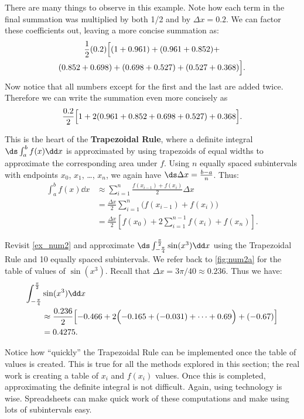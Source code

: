 There are many things to observe in this example. Note how each term in the final summation was multiplied by both 1/2 and by $\Delta x = 0.2$. We can factor these coefficients out, leaving a more concise summation as:
\begin{multline*}
\frac12(0.2)\Bigl[(1+0.961) + (0.961+0.852) +\\
 (0.852+0.698) + ( 0.698+ 0.527) +(0.527 + 0.368)\Bigr].
\end{multline*}
Now notice that all numbers except for the first and the last are added twice. Therefore we can write the summation even more concisely as
\[\frac{0.2}{2}\Bigl[1 + 2(0.961+0.852+0.698+0.527) + 0.368\Bigr].\]

This is the heart of the \textbf{Trapezoidal Rule}, where a definite integral $\ds \int_a^b f(x)\dd x$ is approximated by using trapezoids of equal widths to approximate the corresponding area under $f$. Using $n$ equally spaced subintervals with endpoints $x_0$, $x_1$, \dots, $x_n$, we again have $\ds \Delta x = \frac{b-a}n$. Thus:
\begin{align*}
	\int_a^b f(x)\dd x
	& \approx \sum_{i=1}^n \frac{f(x_{i-1})+f(x_i)}2\Delta x \\
	& = \frac{\Delta x}2 \sum_{i=1}^n \bigl(f(x_{i-1})+f(x_i)\bigr)\\
	& = \frac{\Delta x}2\left[f(x_0)+ 2\sum_{i=1}^{n-1} f(x_i) + f(x_n)\right].
\end{align*}

\begin{example}\label{ex_num4}%
Revisit \autoref{ex_num2} and approximate $\ds\int_{-\frac{\pi}{4}}^{\frac{\pi}{2}} \sin (x^3)\dd x$ using the Trapezoidal Rule and 10 equally spaced subintervals.
\solution
We refer back to \autoref{fig:num2a} for the table of values of $\sin(x^3)$. Recall that $\Delta x = 3\pi/40 \approx 0.236$. Thus we have:\small
\begin{align*}
	\int_{-\frac{\pi}4}^{\frac{\pi}2} & \sin (x^3)\dd x \\
	&\approx \frac{0.236}{2}\Bigl[-0.466 + 2\Bigl(-0.165+(-0.031)+\dotsb+%
0.69\Bigr)+(-0.67)\Bigr]\\
	&= 0.4275.
\end{align*}
\end{example}

Notice how ``quickly'' the Trapezoidal Rule can be implemented once the table of values is created. This is true for all the methods explored in this section; the real work is creating a table of $x_i$ and $f(x_i)$ values. Once this is completed, approximating the definite integral is not difficult. Again, using technology is wise. Spreadsheets can make quick work of these computations and make using lots of subintervals easy. 

